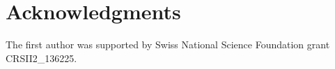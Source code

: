 
\section*{Acknowledgments}

The first author was supported by Swiss National Science Foundation grant CRSII2\_136225.
